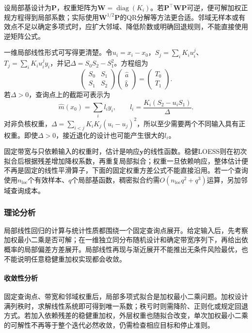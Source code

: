 设局部基设计为$\bm{P}$，权重矩阵为$\bm{W}=\operatorname{diag}(K_i)$。若$\bm{P}^{\top}\bm{W}\bm{P}$可逆，便可解加权正规方程得到局部系数；实际使用$\bm{W}^{1/2}\bm{P}$的QR分解等方法更合适。邻域无样本或有效点不足以确定多项式时，应扩大邻域、降低阶数或明确回退规则，不能直接使用逆矩阵公式。

一维局部线性形式可写得更清楚。令$u_i=x_i-x_0$，$S_j=\sum_iK_iu_i^j$、$T_j=\sum_iK_iu_i^jy_i$，并记$\Delta=S_0S_2-S_1^2$。方程组为
\[
  \begin{pmatrix}S_0&S_1\\S_1&S_2\end{pmatrix}
  \begin{pmatrix}\widehat a\\\widehat b\end{pmatrix}
  =\begin{pmatrix}T_0\\T_1\end{pmatrix}.
\]
若$\Delta>0$，查询点上的截距可表示为
\begin{equation}
  \widehat m(x_0)=\sum_i l_i y_i,\qquad
  l_i=\frac{K_i(S_2-u_iS_1)}{\Delta}.
  \label{eq:regression-local-linear-weights}
\end{equation}
对非负核权重，$\Delta=\sum_{i<j}K_iK_j(u_i-u_j)^2$，所以至少需要两个不同输入具有正权重。即使$\Delta>0$，接近退化的设计也可能产生很大的$l_i$。

固定带宽与只依赖输入的权重时，估计是响应$\bm{y}$的线性函数。稳健LOESS则在初次拟合后根据残差增加降权系数，再重复局部拟合；权重一旦依赖响应，整体估计便不再是固定的线性平滑算子，下面的固定权重方差公式不能直接沿用。若一个查询使用$n_{\mathrm{loc}}$个有效样本、$q$个局部基函数，稠密拟合约需$O(n_{\mathrm{loc}}q^2+q^3)$运算，另加邻域查询成本。

\subsubsection{理论分析}
\label{sec:regression-loess-theory}

局部线性回归的计算与统计性质都围绕一个固定查询点展开。给定输入后，先考察加权最小二乘是否可解；在一维独立同分布随机设计和确定带宽序列下，再给出依概率的局部偏差方差展开。局部线性再现与渐近展开不能推出无条件风险最优，也不能说明任意稳健重加权实现都会收敛。

\paragraph{收敛性分析}
固定查询点、带宽和邻域权重后，局部多项式拟合是加权最小二乘问题。加权设计满列秩时，求解线性系统即可得到唯一系数；秩亏时则需降阶、正则化或规定回退方式。若加入依赖残差的稳健重加权，外层权重也随拟合改变，单次加权最小二乘的可解性不再等于整个迭代必然收敛，仍需检查相应目标和停止准则。

